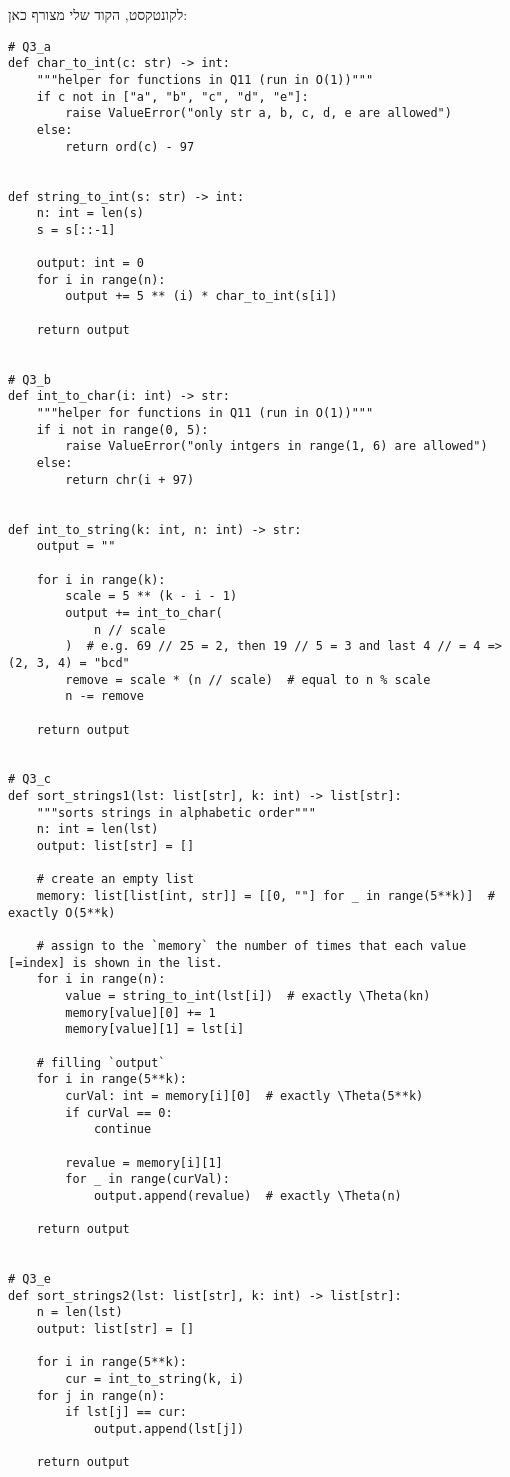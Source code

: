 \documentclass[]{article}
\newcommand\sen   {\begin{otherlanguage}{english}}
\newcommand\she   {\end{otherlanguage}}
\begin{document}
	לקונטקסט, הקוד שלי מצורף כאן: 
	\sen
	\begin{lstlisting}
# Q3_a
def char_to_int(c: str) -> int:
	"""helper for functions in Q11 (run in O(1))"""
	if c not in ["a", "b", "c", "d", "e"]:
		raise ValueError("only str a, b, c, d, e are allowed")
	else:
		return ord(c) - 97


def string_to_int(s: str) -> int:
	n: int = len(s)
	s = s[::-1]
	
	output: int = 0
	for i in range(n):
		output += 5 ** (i) * char_to_int(s[i])
	
	return output


# Q3_b
def int_to_char(i: int) -> str:
	"""helper for functions in Q11 (run in O(1))"""
	if i not in range(0, 5):
		raise ValueError("only intgers in range(1, 6) are allowed")
	else:
		return chr(i + 97)


def int_to_string(k: int, n: int) -> str:
	output = ""
	
	for i in range(k):
		scale = 5 ** (k - i - 1)
		output += int_to_char(
			n // scale
		)  # e.g. 69 // 25 = 2, then 19 // 5 = 3 and last 4 // = 4 => (2, 3, 4) = "bcd"
		remove = scale * (n // scale)  # equal to n % scale
		n -= remove
	
	return output


# Q3_c
def sort_strings1(lst: list[str], k: int) -> list[str]:
	"""sorts strings in alphabetic order"""
	n: int = len(lst)
	output: list[str] = []
	
	# create an empty list
	memory: list[list[int, str]] = [[0, ""] for _ in range(5**k)]  # exactly O(5**k)
	
	# assign to the `memory` the number of times that each value [=index] is shown in the list.
	for i in range(n):
		value = string_to_int(lst[i])  # exactly \Theta(kn)
		memory[value][0] += 1
		memory[value][1] = lst[i]
	
	# filling `output`
	for i in range(5**k):
		curVal: int = memory[i][0]  # exactly \Theta(5**k)
		if curVal == 0:
			continue
		
		revalue = memory[i][1]
		for _ in range(curVal):
			output.append(revalue)  # exactly \Theta(n)
	
	return output


# Q3_e
def sort_strings2(lst: list[str], k: int) -> list[str]:
	n = len(lst)
	output: list[str] = []
	
	for i in range(5**k):
		cur = int_to_string(k, i)
	for j in range(n):
		if lst[j] == cur:
			output.append(lst[j])
	
	return output\end{lstlisting}\she
	
	
\end{document}
